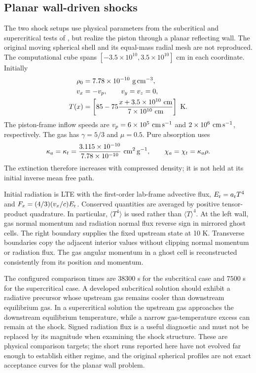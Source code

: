 \documentclass[manuscript]{aastex7}
\newcommand{\Er}{E_{\rm r}}
\newcommand{\ar}{a_{\rm r}}
\begin{document}
\subsection{Planar wall-driven shocks}
The two shock setups use physical parameters from the subcritical and
supercritical tests of \citet{Ensman1994}, but realize the piston through
a planar reflecting wall. The original moving spherical shell and its
equal-mass radial mesh are not reproduced. The computational cube spans
$[-3.5\times10^{10},3.5\times10^{10}]$ cm in each coordinate.
Initially
\begin{align}
 \rho_0&=7.78\times10^{-10}\ {\rm g\,cm^{-3}},\\
 v_x&=-v_p,\qquad v_y=v_z=0,\\
 T(x)&=\left[85-75\frac{x+3.5\times10^{10}\ {\rm cm}}
                       {7\times10^{10}\ {\rm cm}}\right]\ {\rm K}.
\end{align}
The piston-frame inflow speeds are $v_p=6\times10^5\ {\rm cm\,s^{-1}}$
and $2\times10^6\ {\rm cm\,s^{-1}}$, respectively. The gas has
$\gamma=5/3$ and $\mu=0.5$. Pure absorption uses
\begin{equation}
 \kappa_a=\kappa_t=\frac{3.115\times10^{-10}}{7.78\times10^{-10}}
       \ {\rm cm^2\,g^{-1}},\qquad \chi_a=\chi_t=\kappa_a\rho.
 \label{eq:shockopacity}
\end{equation}
The extinction therefore increases with compressed density; it is not
held at its initial inverse mean free path.

Initial radiation is LTE with the first-order lab-frame advective flux,
$\Er=\ar T^4$ and $F_x=(4/3)(v_x/c)\Er$. Conserved quantities are averaged
by positive tensor-product quadrature. In particular, $\langle T^4\rangle$
is used rather than $\langle T\rangle^4$. At the left wall, gas normal
momentum and radiation normal flux reverse sign in mirrored ghost cells.
The right boundary supplies the fixed upstream state at 10 K. Transverse
boundaries copy the adjacent interior values without clipping normal
momentum or radiation flux. The gas angular momentum in a ghost cell is
reconstructed consistently from its position and momentum.

The configured comparison times are $38300$ s for the subcritical case
and $7500$ s for the supercritical case. A developed subcritical solution
should exhibit a radiative precursor whose upstream gas remains cooler
than downstream equilibrium gas. In a supercritical solution the upstream
gas approaches the downstream equilibrium temperature, while a narrow
gas-temperature excess can remain at the shock. Signed radiation flux
is a useful diagnostic and must not be replaced by its magnitude when
examining the shock structure. These are physical comparison targets;
the short runs reported here have not evolved far enough to establish
either regime, and the original spherical profiles are not exact
acceptance curves for the planar wall problem.
\end{document}
